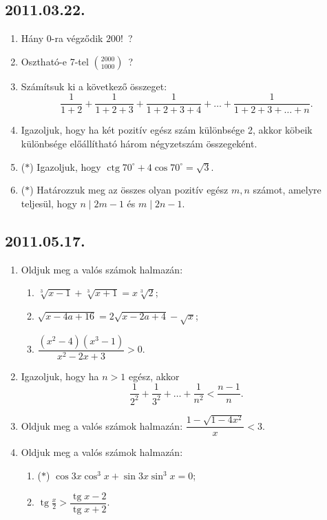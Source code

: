 \documentclass{article}
\newenvironment{abc}{\begin{enumerate}[label=\textit{\alph*})]}{\end{enumerate}}
\newcommand{\tg}{\mathop{\mathrm{tg}}\nolimits}
\newcommand{\ctg}{\mathop{\mathrm{ctg}}\nolimits}
\begin{document}
\subsection*{2011.03.22.}
\begin{enumerate}
\item Hány 0-ra végződik $200!$\, ?
\item Osztható-e 7-tel $\binom{2000}{1000}$\, ?
\item Számítsuk ki a következő összeget:
$$\dfrac{1}{1+2}+\dfrac{1}{1+2+3}+\dfrac{1}{1+2+3+4}+\ldots+\dfrac{1}{1+2+3+\ldots+n}.$$
\item Igazoljuk, hogy ha két pozitív egész szám különbsége 2, akkor köbeik különbsége előállítható három négyzetszám összegeként.
\item ($*$) Igazoljuk, hogy $\ctg 70^\circ+4\cos 70^\circ=\sqrt{3}$.
\item ($*$) Határozzuk meg az összes olyan pozitív egész $m,n$ számot, amelyre teljesül, hogy $n\mid 2m-1$ és $m\mid 2n-1$.
\end{enumerate}

\subsection*{2011.05.17.}
\begin{enumerate}
\item Oldjuk meg a valós számok halmazán:
\begin{abc}
\item $\sqrt[3]{x-1}+\sqrt[3]{x+1}=x\sqrt[3]{2}$;
\item $\sqrt{x-4a+16}=2\sqrt{x-2a+4}-\sqrt{x}$;
\item $\dfrac{(x^2-4)(x^3-1)}{x^2-2x+3}>0$.
\end{abc}
\item Igazoljuk, hogy ha $n>1$ egész, akkor
$$\dfrac{1}{2^2}+\dfrac{1}{3^2}+\ldots+\dfrac{1}{n^2}<\dfrac{n-1}{n}.$$
\item Oldjuk meg a valós számok halmazán: $\dfrac{1-\sqrt{1-4x^2}}{x}<3$.
\item Oldjuk meg a valós számok halmazán:
\begin{abc}
\item ($*$) $\cos 3x\cos^3 x+\sin 3x\sin^3 x=0$;
\item $\tg\frac{x}{2}>\dfrac{\tg x-2}{\tg x+2}$.
\end{abc}
\end{enumerate}
\end{document}
